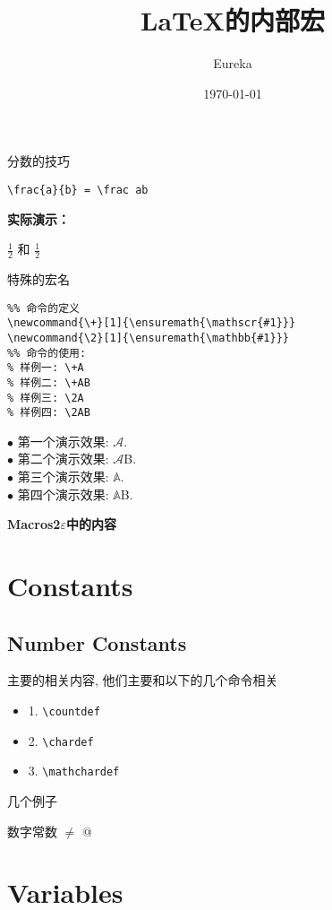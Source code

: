 \documentclass[fontset=windows, 12pt]{article}
\title{\LaTeX 的内部宏}
\author{Eureka}
\date{\today}
\newcommand{\+}[1]{\ensuremath{\mathscr{#1}}}
\newcommand{\2}[1]{\ensuremath{\mathbb{#1}}}
\begin{document}
\maketitle


\begin{tformal}{分数的技巧}
    \begin{verbatim}
\frac{a}{b} = \frac ab
    \end{verbatim}

\noindent \textbf{实际演示：}\par 

$\frac{1}{2}$ 和 $\frac12$
\end{tformal}

\begin{tformal}{特殊的宏名}
\begin{verbatim}
%% 命令的定义
\newcommand{\+}[1]{\ensuremath{\mathscr{#1}}}
\newcommand{\2}[1]{\ensuremath{\mathbb{#1}}}
%% 命令的使用:
% 样例一: \+A
% 样例二: \+AB
% 样例三: \2A
% 样例四: \2AB
\end{verbatim}


$\bullet$  第一个演示效果: \+A. \\
$\bullet$  第二个演示效果: \+AB. \\
$\bullet$  第三个演示效果: \2A. \\
$\bullet$  第四个演示效果: \2AB. \\
\end{tformal}

\newpage
\centerline{\textbf{Macros2$\varepsilon$中的内容}}

\section{Constants}
\subsection{Number Constants}
主要的相关内容, 他们主要和以下的几个命令相关
\begin{itemize}
    \item 1. \verb |\countdef|
    \item 2. \verb |\chardef|
    \item 3. \verb |\mathchardef|
\end{itemize}
几个例子
\begin{tformal}{数字常数}
    \makeatletter
    \@ne $\ne$ @
    \makeatother
\end{tformal}

\section{Variables}
\end{document}
